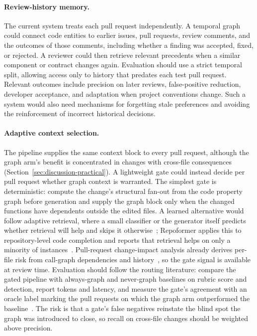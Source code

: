\paragraph{Review-history memory.}
The current system treats each pull request independently. A temporal graph
could connect code entities to earlier issues, pull requests, review comments,
and the outcomes of those comments, including whether a finding was accepted,
fixed, or rejected. A reviewer could then retrieve relevant precedents when a
similar component or contract changes again. Evaluation should use a strict
temporal split, allowing access only to history that predates each test pull
request. Relevant outcomes include precision on later reviews, false-positive
reduction, developer acceptance, and adaptation when project conventions
change. Such a system would also need mechanisms for forgetting stale
preferences and avoiding the reinforcement of incorrect historical decisions.

\paragraph{Adaptive context selection.}
The pipeline supplies the same context block to every pull request, although
the graph arm's benefit is concentrated in changes with cross-file
consequences (Section~\ref{sec:discussion-practical}). A lightweight gate
could instead decide per pull request whether graph context is warranted.
The simplest gate is deterministic: compute the change's structural fan-out
from the code property graph before generation and supply the graph block
only when the changed functions have dependents outside the edited files. A
learned alternative would follow adaptive retrieval, where a small classifier
or the generator itself predicts whether retrieval will help and skips it
otherwise~\cite{jeong2024adaptiverag,asai2024selfrag,jiang2023flare};
Repoformer applies this to repository-level code completion and reports that
retrieval helps on only a minority of instances~\cite{wu2024repoformer}.
Pull-request change-impact analysis already derives per-file risk from
call-graph dependencies and history~\cite{gocmen2025changeimpact}, so the
gate signal is available at review time. Evaluation should follow the
routing literature: compare the gated pipeline with always-graph and
never-graph baselines on rubric score and detection, report tokens and
latency, and measure the gate's agreement with an oracle label marking the
pull requests on which the graph arm outperformed the
baseline~\cite{ong2025routellm,chen2024frugalgpt}. The risk is that a gate's
false negatives reinstate the blind spot the graph was introduced to close,
so recall on cross-file changes should be weighted above precision.

